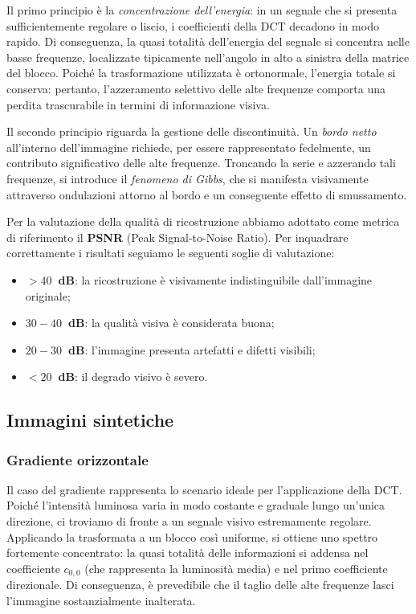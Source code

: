 \documentclass[11pt,a4paper]{article}
\begin{document}
Il primo principio è la \emph{concentrazione dell'energia}: in un segnale che si presenta sufficientemente regolare o
liscio, i coefficienti della DCT decadono in modo rapido. Di conseguenza, la quasi totalità dell'energia del segnale 
si concentra nelle basse frequenze, localizzate tipicamente nell'angolo in alto a sinistra della matrice del blocco. 
Poiché la trasformazione utilizzata è ortonormale, l'energia totale si conserva: pertanto,
l'azzeramento selettivo delle alte frequenze comporta una perdita trascurabile in termini di 
informazione visiva.

Il secondo principio riguarda la gestione delle discontinuità. Un \emph{bordo netto} all'interno dell'immagine richiede, 
per essere rappresentato fedelmente, un contributo significativo delle alte frequenze. 
Troncando la serie e azzerando tali frequenze, si introduce il \emph{fenomeno di Gibbs}, che si manifesta visivamente 
attraverso ondulazioni attorno al bordo e un conseguente effetto di smussamento. 

Per la valutazione della qualità di ricostruzione abbiamo adottato come metrica di riferimento il 
\textbf{PSNR} (Peak Signal-to-Noise Ratio). 
Per inquadrare correttamente i risultati seguiamo le seguenti soglie di valutazione:
\begin{itemize}
    \item \textbf{$> 40$~dB}: la ricostruzione è visivamente indistinguibile dall'immagine originale;
    \item \textbf{$30 - 40$~dB}: la qualità visiva è considerata buona;
    \item \textbf{$20 - 30$~dB}: l'immagine presenta artefatti e difetti visibili;
    \item \textbf{$< 20$~dB}: il degrado visivo è severo.
\end{itemize}

\subsection{Immagini sintetiche}

\subsubsection{Gradiente orizzontale}

Il caso del gradiente rappresenta lo scenario ideale per l'applicazione della DCT. 
Poiché l'intensità luminosa varia in modo costante e graduale lungo un'unica direzione, 
ci troviamo di fronte a un segnale visivo estremamente regolare. Applicando la trasformata 
a un blocco così uniforme, si ottiene uno spettro fortemente concentrato: la quasi 
totalità delle informazioni si addensa nel coefficiente $c_{0,0}$ 
  (che rappresenta la luminosità media) e nel primo coefficiente direzionale. Di conseguenza, 
  è prevedibile che il taglio delle alte frequenze lasci l'immagine sostanzialmente inalterata.
\end{document}
